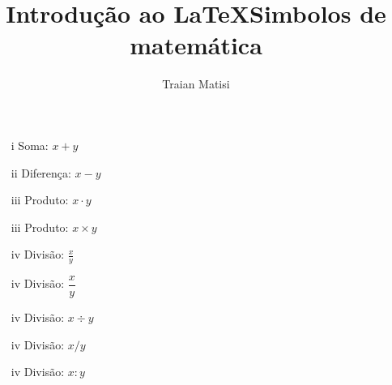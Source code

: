 \documentclass[a4paper, 14pt]{article}
\title{Introdução ao \LaTeX}
\author{Traian Matisi}
\begin{document}
\maketitle

\title{Simbolos de matemática}

\begin{itemize} %

\item [i] Soma: $x+y$
\item [ii] Diferença: $x-y$
\item [iii] Produto: $x\cdot y$
\item [iii] Produto: $x\times y$
\item [iv] Divisão: $\frac{x}{y}$
\item [iv] Divisão: $\dfrac{x}{y}$
\item [iv] Divisão: $x\div y$
\item [iv] Divisão: $x / y$
\item [iv] Divisão: $x : y$

\end{itemize}
\end{document}

